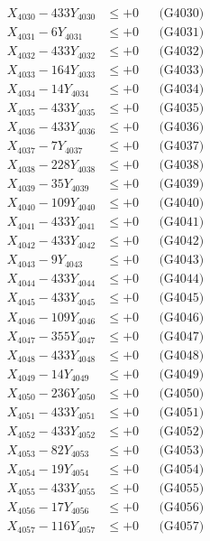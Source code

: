\documentclass[a4paper,10pt]{article}
\begin{document}
{\begin{align}
X_{4030} - 433Y_{4030} &\leq +0 && \text{(G4030)} \\
\allowbreak
X_{4031} - 6Y_{4031} &\leq +0 && \text{(G4031)} \\
X_{4032} - 433Y_{4032} &\leq +0 && \text{(G4032)} \\
X_{4033} - 164Y_{4033} &\leq +0 && \text{(G4033)} \\
X_{4034} - 14Y_{4034} &\leq +0 && \text{(G4034)} \\
X_{4035} - 433Y_{4035} &\leq +0 && \text{(G4035)} \\
X_{4036} - 433Y_{4036} &\leq +0 && \text{(G4036)} \\
X_{4037} - 7Y_{4037} &\leq +0 && \text{(G4037)} \\
X_{4038} - 228Y_{4038} &\leq +0 && \text{(G4038)} \\
X_{4039} - 35Y_{4039} &\leq +0 && \text{(G4039)} \\
X_{4040} - 109Y_{4040} &\leq +0 && \text{(G4040)} \\
\allowbreak
X_{4041} - 433Y_{4041} &\leq +0 && \text{(G4041)} \\
X_{4042} - 433Y_{4042} &\leq +0 && \text{(G4042)} \\
X_{4043} - 9Y_{4043} &\leq +0 && \text{(G4043)} \\
X_{4044} - 433Y_{4044} &\leq +0 && \text{(G4044)} \\
X_{4045} - 433Y_{4045} &\leq +0 && \text{(G4045)} \\
X_{4046} - 109Y_{4046} &\leq +0 && \text{(G4046)} \\
X_{4047} - 355Y_{4047} &\leq +0 && \text{(G4047)} \\
X_{4048} - 433Y_{4048} &\leq +0 && \text{(G4048)} \\
X_{4049} - 14Y_{4049} &\leq +0 && \text{(G4049)} \\
X_{4050} - 236Y_{4050} &\leq +0 && \text{(G4050)} \\
\allowbreak
X_{4051} - 433Y_{4051} &\leq +0 && \text{(G4051)} \\
X_{4052} - 433Y_{4052} &\leq +0 && \text{(G4052)} \\
X_{4053} - 82Y_{4053} &\leq +0 && \text{(G4053)} \\
X_{4054} - 19Y_{4054} &\leq +0 && \text{(G4054)} \\
X_{4055} - 433Y_{4055} &\leq +0 && \text{(G4055)} \\
X_{4056} - 17Y_{4056} &\leq +0 && \text{(G4056)} \\
X_{4057} - 116Y_{4057} &\leq +0 && \text{(G4057)} \\

\end{align}}
\end{document}
